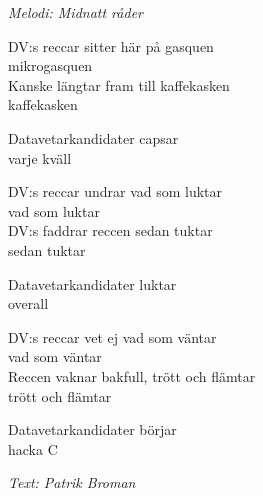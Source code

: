 {\footnotesize\textit{Melodi: Midnatt råder}}\par
\vspace{10pt}
DV:s reccar sitter här på gasquen \\
mikrogasquen\\
Kanske längtar fram till kaffekasken\\
kaffekasken\par
\vspace{10pt}
Datavetarkandidater capsar\\
varje kväll\par
\vspace{10pt}
DV:s reccar undrar vad som luktar\\
vad som luktar\\
DV:s faddrar reccen sedan tuktar\\
sedan tuktar\par
\vspace{10pt}
Datavetarkandidater luktar\\
overall\par
\vspace{10pt}
DV:s reccar vet ej vad som väntar\\
vad som väntar\\
Reccen vaknar bakfull, trött och flämtar\\
trött och flämtar\par
\vspace{10pt}
Datavetarkandidater börjar\\
hacka C\par
\vspace{10pt}
{\footnotesize\textit{Text: Patrik Broman}}
